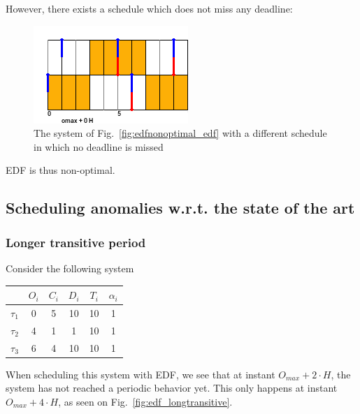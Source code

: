 \documentclass[a4paper,10pt]{article}
\begin{document}
        However, there exists a schedule which does not miss any deadline:\\

        \begin{figure}[H]
        \begin{center}
            \includegraphics{figs/edfNonOptimal_PALLF.png}
            \caption{The system of Fig.~\ref{fig:edfnonoptimal_edf} with a different schedule in which no deadline is missed}
            \label{fig:edfnonoptimal_pallf}
        \end{center}
        \end{figure}

        EDF is thus non-optimal.

    \subsection{Scheduling anomalies w.r.t. the state of the art}


        \subsubsection{Longer transitive period}
        Consider the following system

        \begin{center}
            \begin{tabular}{|r|c|c|c|c|c|}
                \hline
                            & $O_i$ & $C_i$ & $D_i$ & $T_i$ & $\alpha_i$ \\ \hline
                $\tau_1$    & 0     & 5     & 10   & 10    & 1     \\ \hline
                $\tau_2$    & 4     & 1     & 1    & 10    & 1     \\ \hline
                $\tau_3$    & 6     & 4     & 10   & 10    & 1     \\ \hline
            \end{tabular}
        \end{center}

        When scheduling this system with EDF, we see that at instant $O_{max} + 2 \cdot H$, the system has not reached a periodic behavior yet. This only happens at instant $O_{max} + 4 \cdot H$, as seen on Fig.~\ref{fig:edf_longtransitive}.\\
\end{document}
